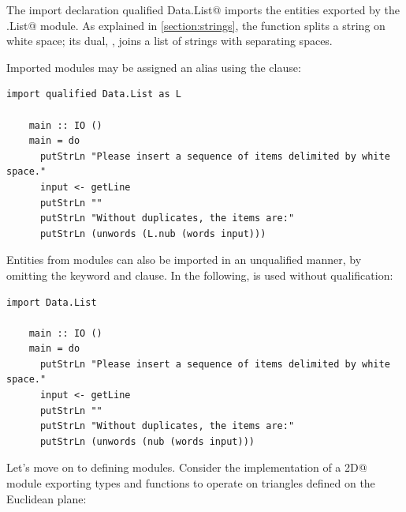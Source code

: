 \documentclass[UdineBachThesis,american,11pt]{PhdThesis}
\begin{document}
  The import declaration \lstinline@import qualified Data.List@ imports the
  entities exported by the \lstinline@Data.List@ module. As explained in
  \autoref{section:strings}, the function \lstinline@words@  splits a string on
  white space; its dual, \lstinline@unwords@, joins a list of strings with
  separating spaces.

  Imported modules may be assigned an alias using the \lstinline@as@ clause:

  \begin{lstlisting}[gobble=4,basicstyle=\ttfamily\small]
    import qualified Data.List as L

    main :: IO ()
    main = do
      putStrLn "Please insert a sequence of items delimited by white space."
      input <- getLine
      putStrLn ""
      putStrLn "Without duplicates, the items are:"
      putStrLn (unwords (L.nub (words input)))
  \end{lstlisting}

  Entities from modules can also be imported in an unqualified manner, by
  omitting the \lstinline@qualified@ keyword and \lstinline@as@ clause. In the
  following, \lstinline@nub@ is used without qualification:

  \begin{lstlisting}[gobble=4,basicstyle=\ttfamily\small]
    import Data.List

    main :: IO ()
    main = do
      putStrLn "Please insert a sequence of items delimited by white space."
      input <- getLine
      putStrLn ""
      putStrLn "Without duplicates, the items are:"
      putStrLn (unwords (nub (words input)))
  \end{lstlisting}

  Let's move on to defining modules. Consider the implementation of a
  \lstinline@Triangle2D@ module exporting types and functions to operate on
  triangles defined on the Euclidean plane:
\end{document}
